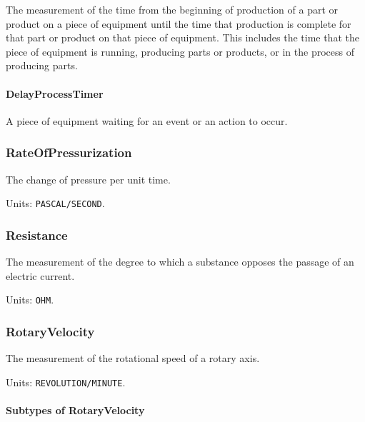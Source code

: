 The measurement of the time from the beginning of production of a part or product on a piece of equipment until the time that production is complete for that part or product on that piece of equipment.  This includes the time that the piece of equipment is running, producing parts or products, or in the process of producing parts.


\paragraph{DelayProcessTimer}\mbox{}
\label{sec:DelayProcessTimer}


A piece of equipment waiting for an event or an action to occur.


\subsubsection{RateOfPressurization}
\label{sec:RateOfPressurization}



The change of pressure per unit time.


Units: \texttt{PASCAL/SECOND}.

\subsubsection{Resistance}
\label{sec:Resistance}



The measurement of the degree to which a substance opposes the passage of an electric current.


Units: \texttt{OHM}.

\subsubsection{RotaryVelocity}
\label{sec:RotaryVelocity}



The measurement of the rotational speed of a rotary axis.


Units: \texttt{REVOLUTION/MINUTE}.

\paragraph{Subtypes of RotaryVelocity}\mbox{}
\label{sec:Subtypes of RotaryVelocity}

